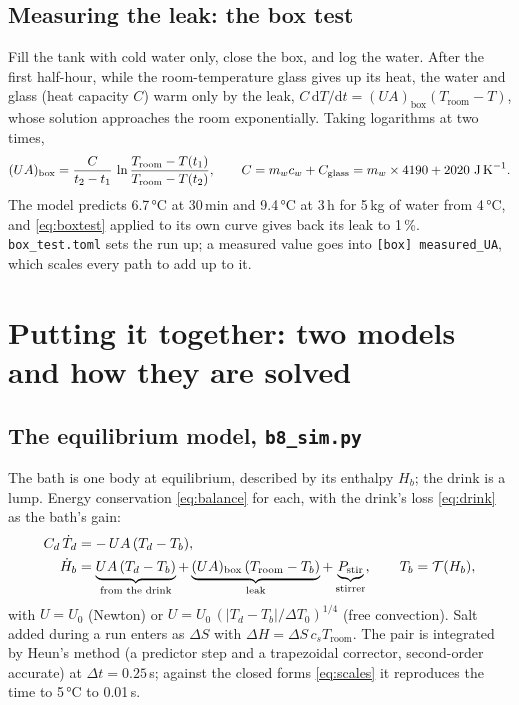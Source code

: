 \documentclass[11pt,a4paper]{article}
\newcommand{\code}[1]{\texttt{#1}}
\begin{document}
\subsection{Measuring the leak: the box test}
\label{sec:boxtest}
Fill the tank with cold water only, close the box, and log the water. After the first half-hour, while
the room-temperature glass gives up its heat, the water and glass (heat capacity $C$) warm only by the
leak, $C\,\mathrm dT/\mathrm dt = (UA)_{\text{box}}(T_{\text{room}} - T)$, whose solution approaches the
room exponentially. Taking logarithms at two times,
\begin{equation}
(UA)_{\text{box}} = \frac{C}{t_2 - t_1}\,\ln\frac{T_{\text{room}} - T(t_1)}{T_{\text{room}} - T(t_2)},
\qquad C = m_w c_w + C_{\text{glass}} = m_w \times 4190 + 2020\ \text{J\,K}^{-1}.
\label{eq:boxtest}
\end{equation}
The model predicts 6.7\,°C at 30\,min and 9.4\,°C at 3\,h for 5\,kg of water from 4\,°C, and
\eqref{eq:boxtest} applied to its own curve gives back its leak to 1\,\%. \code{box\_test.toml} sets the
run up; a measured value goes into \code{[box] measured\_UA}, which scales every path to add up to it.

\section{Putting it together: two models and how they are solved}
\label{sec:numerics}

\subsection{The equilibrium model, \code{b8\_sim.py}}
The bath is one body at equilibrium, described by its enthalpy $H_b$; the drink is a lump. Energy
conservation \eqref{eq:balance} for each, with the drink's loss \eqref{eq:drink} as the bath's gain:
\begin{align}
C_d\,\dot T_d &= -\,U A\,(T_d - T_b),
\notag\\
\dot H_b &= \underbrace{U A\,(T_d - T_b)}_{\text{from the drink}}
  + \underbrace{(UA)_{\text{box}}\,(T_{\text{room}} - T_b)}_{\text{leak}}
  + \underbrace{P_{\text{stir}}}_{\text{stirrer}},
\qquad T_b = \mathcal T(H_b),
\label{eq:bath}
\end{align}
with $U = U_0$ (Newton) or $U = U_0\,(|T_d-T_b|/\Delta T_0)^{1/4}$ (free convection). Salt added during
a run enters as $\Delta S$ with $\Delta H = \Delta S\,c_s T_{\text{room}}$. The pair is integrated by
Heun's method (a predictor step and a trapezoidal corrector, second-order accurate) at
$\Delta t = 0.25$\,s; against the closed forms \eqref{eq:scales} it reproduces the time to 5\,°C to
0.01\,s.
\end{document}
